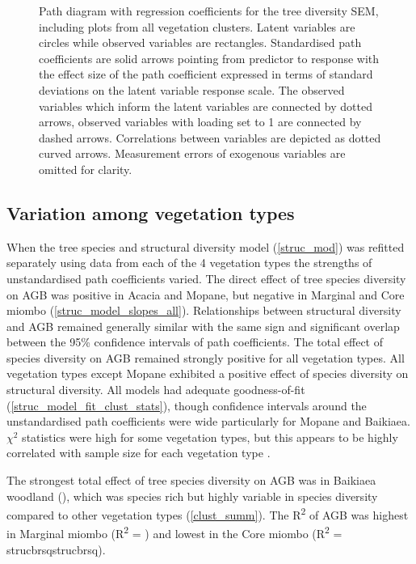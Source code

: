 \documentclass[11pt,a4paper]{article}
\begin{document}
\begin{figure}[H]
\centering
	
	\caption{Path diagram with regression coefficients for the tree diversity SEM, including plots from all vegetation clusters. Latent variables are circles while observed variables are rectangles. Standardised path coefficients are solid arrows pointing from predictor to response with the effect size of the path coefficient expressed in terms of standard deviations on the latent variable response scale. The observed variables which inform the latent variables are connected by dotted arrows, observed variables with loading set to 1 are connected by dashed arrows. Correlations between variables are depicted as dotted curved arrows. Measurement errors of exogenous variables are omitted for clarity.}
	\label{struc_mod}
\end{figure}

\subsection{Variation among vegetation types}

When the tree species and structural diversity model (\autoref{struc_mod}) was refitted separately using data from each of the 4 vegetation types the strengths of unstandardised path coefficients varied.  The direct effect of tree species diversity on AGB was positive in Acacia and Mopane, but negative in Marginal and Core miombo (\autoref{struc_model_slopes_all}). Relationships between structural diversity and AGB remained generally similar with the same sign and significant overlap between the 95\% confidence intervals of path coefficients. The total effect of species diversity on AGB remained strongly positive for all vegetation types. All vegetation types except Mopane exhibited a positive effect of species diversity on structural diversity. All models had adequate goodness-of-fit (\autoref{struc_model_fit_clust_stats}), though confidence intervals around the unstandardised path coefficients were wide particularly for Mopane and Baikiaea. $\chi^{2}$ statistics were high for some vegetation types, but this appears to be highly correlated with sample size for each vegetation type \citep{Hooper2008}.

The strongest total effect of tree species diversity on AGB was in Baikiaea woodland (\struccsb{}), which was species rich but highly variable in species diversity compared to other vegetation types (\autoref{clust_summ}). The R\textsuperscript{2} of AGB was highest in Marginal miombo (R\textsuperscript{2} = \strucarsq{}) and lowest in the Core miombo (R\textsuperscript{2} = \\strucbrsq{}strucbrsq{}).
\end{document}
